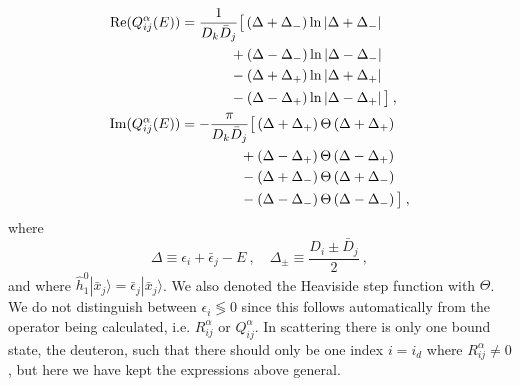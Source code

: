 \documentclass[aps,prc,showpacs,twocolumn,floatfix,nobibnotes,nofootinbib,amsmath,amssymb,longbibliography]{revtex4-2}
\begin{document}
\begin{align}
	\begin{split}
	\text{Re}(Q_{ij}^\alpha(E)) &=
	\frac{1}{D_k\bar{D}_j}\big[
	                 \left(\Delta+\Delta_-\right)\ln\left|\Delta+\Delta_-\right|\\
	&\hspace{1.24cm}+\left(\Delta-\Delta_-\right)\ln\left|\Delta-\Delta_-\right|\\
	&\hspace{1.24cm}-\left(\Delta+\Delta_+\right)\ln\left|\Delta+\Delta_+\right|\\
	&\hspace{1.24cm}-\left(\Delta-\Delta_+\right)\ln\left|\Delta-\Delta_+\right|\big] \:,\\
	\text{Im}(Q_{ij}^\alpha(E)) &= -\frac{\pi}{D_k\bar{D}_j}\big[
	                \left(\Delta+\Delta_+\right)\Theta\left(\Delta+\Delta_+\right)\\
	&\hspace{1.5cm}+\left(\Delta-\Delta_+\right)\Theta\left(\Delta-\Delta_+\right)\\
	&\hspace{1.5cm}-\left(\Delta+\Delta_-\right)\Theta\left(\Delta+\Delta_-\right)\\
	&\hspace{1.5cm}-\left(\Delta-\Delta_-\right)\Theta\left(\Delta-\Delta_-\right)\big] \:,
	\end{split}
\end{align}
where
\begin{equation}
	\Delta \equiv \epsilon_i + \bar{\epsilon}_j - E \:,\quad
	\Delta_\pm \equiv \frac{D_i\pm\bar{D}_j}{2} \:,
\end{equation}
and where
$\hat{h}_1^0|\bar{x}_j\rangle=\bar{\epsilon}_j|\bar{x}_j\rangle$. We
also denoted the Heaviside step function with $\Theta$. We do not
distinguish between $\epsilon_i\lessgtr0$ since this follows
automatically from the operator being calculated, i.e. $R_{ij}^\alpha$
or $Q_{ij}^\alpha$. In \Nd{} scattering there is only one
\NN{} bound state, the deuteron, such that there should only be one
index $i=i_d$ where $R_{ij}^\alpha\neq0$, but here we have kept the
expressions above general.
\end{document}

